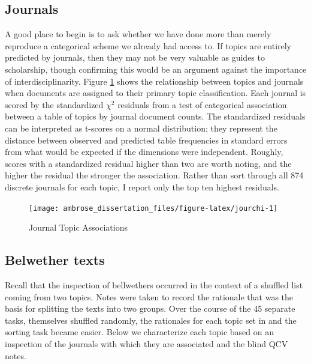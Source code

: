 \documentclass[]{book}
\theoremstyle{definition}
\theoremstyle{definition}
\theoremstyle{definition}
\theoremstyle{remark}
\begin{document}
\hypertarget{journals}{%
\subsection{Journals}\label{journals}}

A good place to begin is to ask whether we have done more than merely
reproduce a categorical scheme we already had access to. If topics are
entirely predicted by journals, then they may not be very valuable as
guides to scholarship, though confirming this would be an argument
against the importance of interdisciplinarity. Figure \ref{fig:jourchi}
shows the relationship between topics and journals when documents are
assigned to their primary topic classification. Each journal is scored
by the standardized \(\chi^2\) residuals from a test of categorical
association between a table of topics by journal document counts. The
standardized residuals can be interpreted as t-scores on a normal
distribution; they represent the distance between observed and predicted
table frequencies in standard errors from what would be expected if the
dimensions were independent. Roughly, scores with a standardized
residual higher than two are worth noting, and the higher the residual
the stronger the association. Rather than sort through all 874 discrete
journals for each topic, I report only the top ten highest residuals.

\begin{figure}

{\centering \texttt{[image: ambrose\_dissertation\_files/figure-latex/jourchi-1]} 

}

\caption{Journal Topic Associations}\label{fig:jourchi}
\end{figure}

\hypertarget{belwether-texts}{%
\subsection{Belwether texts}\label{belwether-texts}}

Recall that the inspection of bellwethers occurred in the context of a
shuffled list coming from two topics. Notes were taken to record the
rationale that was the basis for splitting the texts into two groups.
Over the course of the 45 separate tasks, themselves shuffled randomly,
the rationales for each topic set in and the sorting task became easier.
Below we characterize each topic based on an inspection of the journals
with which they are associated and the blind QCV notes.
\end{document}
